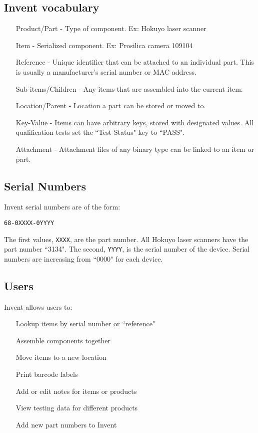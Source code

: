 \documentclass[11pt]{report}
\begin{document}
\subsection{Invent vocabulary}
\begin{itemize}
\item[Product/Part] - Type of component. Ex: Hokuyo laser scanner
\item[Item] - Serialized component. Ex: Prosilica camera 109104
\item[Reference] - Unique identifier that can be attached to an individual part. This is usually a manufacturer's serial number or MAC address.
\item[Sub-items/Children] - Any items that are assembled into the current item.
\item[Location/Parent] - Location a part can be stored or moved to.
\item[Key-Value] - Items can have arbitrary keys, stored with designated values. All qualification tests set the ``Test Status" key to ``PASS".
\item[Attachment] - Attachment files of any binary type can be linked to an item or part.
\end{itemize}

\subsection{Serial Numbers}
Invent serial numbers are of the form:
\begin{verbatim}
68-0XXXX-0YYYY
\end{verbatim}
The first values, \texttt{XXXX}, are the part number. All Hokuyo laser scanners have the part number ``3134". The second, \texttt{YYYY}, is the serial number of the device. Serial numbers are increasing from ``0000" for each device.

\subsection{Users}
Invent allows users to:
\begin{itemize}
\item[Lookup] items by serial number or ``reference"
\item[Assemble] components together
\item[Move] items to a new location
\item[Print] barcode labels 
\item[Add] or edit notes for items or products
\item[View] testing data for different products
\item[Add] new part numbers to Invent
\end{itemize}
\end{document}
